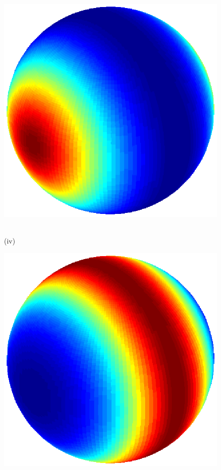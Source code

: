 \documentclass[dvips,aoas,preprint]{imsart}
\numberwithin{equation}{section}
\theoremstyle{plain}
\begin{document}
\begin{figure}[!htbp]
\begin{minipage}[]{0.12\textwidth}
    \end{minipage}
    \begin{minipage}[]{0.12\textwidth}
      \centering
      \includegraphics*[width=\textwidth]{figure3a1.eps}
    \end{minipage}\\
    (iv)
    \begin{minipage}[]{0.12\textwidth}
      \centering
      \includegraphics*[width=\textwidth]{figure4a1.eps}

\end{minipage}
\end{figure}
\end{document}
